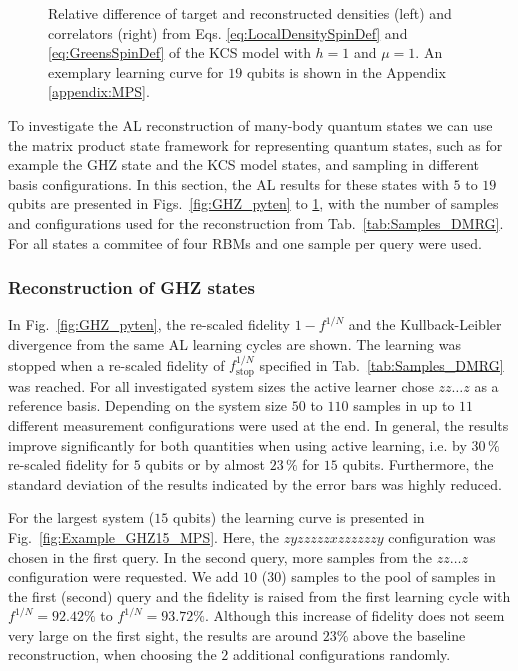 \documentclass[pra,aps,showpacs,groupedaddress,superscriptaddress,twocolumn,toc=flat,biblatex,footinbib]{revtex4-1}
\begin{document}
\begin{figure}[t]
\begin{minipage}[t]{0.23\textwidth}
\end{minipage}
	\caption[]{Relative difference of target and reconstructed densities (left) and correlators (right) from Eqs. \eqref{eq:LocalDensitySpinDef} and \eqref{eq:GreensSpinDef} of the KCS model with $h=1$ and $\mu=1$. An exemplary learning curve for $19$ qubits is shown in the Appendix \ref{appendix:MPS}.}
	\label{fig:LGT_h=1}
\end{figure}



To investigate the AL reconstruction of many-body quantum states we can use the matrix product state framework for representing quantum states, such as for example the GHZ state and the KCS model states, and sampling in different basis configurations.
In this section, the AL results for these states with $5$ to $19$ qubits are presented in Figs.~\ref{fig:GHZ_pyten} to \ref{fig:LGT_h=1}, with the number of samples and configurations used for the reconstruction from Tab.~\ref{tab:Samples_DMRG}. For all states a commitee of four RBMs and one sample per query were used. 

\subsubsection{Reconstruction of GHZ states}
In Fig.~\ref{fig:GHZ_pyten}, the re-scaled fidelity $1-f^{1/N}$ and the Kullback-Leibler divergence from the same AL learning cycles are shown. The learning was stopped when a re-scaled fidelity of $f^{1/N}_{\mathrm{stop}}$ specified in Tab.~\ref{tab:Samples_DMRG} was reached. For all investigated system sizes the active learner chose $zz\dots z$ as a reference basis. Depending on the system size $50$ to $110$ samples in up to $11$ different measurement configurations were used at the end. In general, the results improve significantly for both quantities when using active learning, i.e. by $30\, \%$ re-scaled fidelity for $5$ qubits or by almost $23\,\%$ for $15$ qubits. Furthermore, the standard deviation of the results indicated by the error bars was highly reduced. 

For the largest system ($15$ qubits) the learning curve is presented in Fig.~\ref{fig:Example_GHZ15_MPS}. Here, the $zyzzzzzxzzzzzzy$ configuration was chosen in the first query. In the second query, more samples from the $zz\dots z$ configuration were requested. We add $10$ ($30$) samples to the pool of samples in the first (second) query and the fidelity is raised from the first learning cycle with $f^{1/N}= 92.42\%$ to $f^{1/N}=93.72\%$. Although this increase of fidelity does not seem very large on the first sight, the results are around $23\%$ above the baseline reconstruction, when choosing the $2$ additional configurations randomly.
\end{document}
